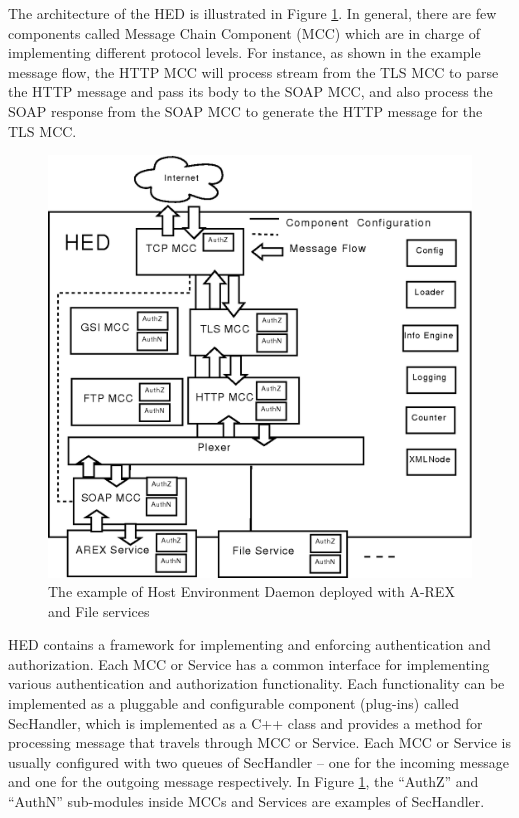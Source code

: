 \documentclass[twocolumn]{svjour3}         %
\begin{document}
The architecture of the HED is illustrated in Figure \ref{fig:HED}. In general, there are few components called Message Chain Component (MCC) which are in charge of implementing different protocol levels. For instance, as shown in the example message flow, the HTTP MCC will process stream from the TLS MCC to parse the HTTP message and pass its body to the SOAP MCC, and also process the SOAP response from the SOAP MCC to generate the HTTP message for the TLS MCC.

\begin{figure}
\includegraphics[width=0.9\columnwidth]{HED.png}
\caption{The example of Host Environment Daemon deployed with A-REX and File services}
\label{fig:HED}
\end{figure}
HED contains a framework for implementing and enforcing authentication and authorization. Each MCC or Service has a common interface for implementing various authentication and authorization functionality. Each functionality can be implemented as a pluggable and configurable component (plug-ins) called SecHandler, which is implemented as a C++ class and provides a method for processing message that travels through MCC or Service. Each MCC or Service is usually configured with two queues of SecHandler -- one for the incoming message and one for the outgoing message respectively. In Figure \ref{fig:HED}, the ``AuthZ'' and ``AuthN'' sub-modules inside MCCs and Services are examples of SecHandler.
\end{document}
